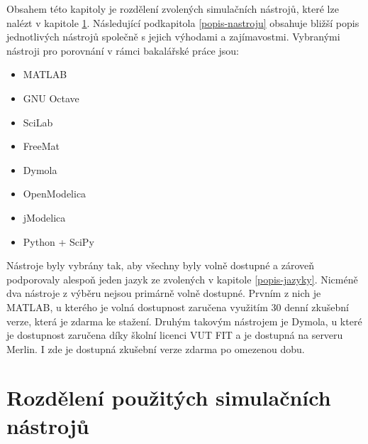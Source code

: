 Obsahem této kapitoly je rozdělení zvolených simulačních nástrojů, které lze nalézt v kapitole \ref{rozdeleni-nastroju}. Následující podkapitola \ref{popis-nastroju} obsahuje bližší popis jednotlivých nástrojů společně s jejich výhodami a zajímavostmi. Vybranými nástroji pro porovnání v rámci bakalářské práce jsou:
\begin{itemize}
    \item MATLAB
    \item GNU Octave
    \item SciLab
    \item FreeMat
    \item Dymola
    \item OpenModelica
    \item jModelica
    \item Python + SciPy
\end{itemize}

Nástroje byly vybrány tak, aby všechny byly volně dostupné a zároveň podporovaly alespoň jeden jazyk ze zvolených v kapitole \ref{popis-jazyky}. Nicméně dva nástroje z výběru nejsou primárně volně dostupné. Prvním z nich je MATLAB, u kterého je volná dostupnost zaručena využitím 30 denní zkušební verze, která je zdarma ke stažení. Druhým takovým nástrojem je Dymola, u které je dostupnost zaručena díky školní licenci VUT FIT a je dostupná na serveru Merlin. I zde je dostupná zkušební verze zdarma po omezenou dobu.

\section{Rozdělení použitých simulačních nástrojů}
\label{rozdeleni-nastroju}

